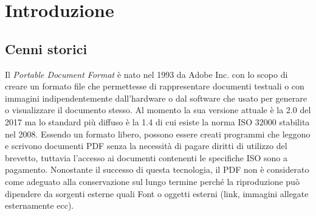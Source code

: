 \chapter{Introduzione}
\section{Cenni storici}
Il \textit{Portable Document Format} è nato nel 1993 da Adobe Inc. con lo scopo di creare un formato file che permettesse di rappresentare documenti testuali o con immagini indipendentemente dall'hardware o dal software che usato per generare o visualizzare il documento stesso. Al momento la sua versione attuale è la 2.0 del 2017 ma lo standard più diffuso è la 1.4 di cui esiste la norma ISO 32000 stabilita nel 2008.
Essendo un formato libero, possono essere creati programmi che leggono e scrivono documenti PDF senza la necessità di pagare diritti di utilizzo del brevetto, tuttavia l'accesso ai documenti contenenti le specifiche ISO sono a pagamento.
Nonostante il successo di questa tecnologia, il PDF non è considerato come adeguato alla conservazione sul lungo termine perché la riproduzione può dipendere da sorgenti esterne quali Font o oggetti esterni (link, immagini allegate esternamente ecc).
\par\bigskip

